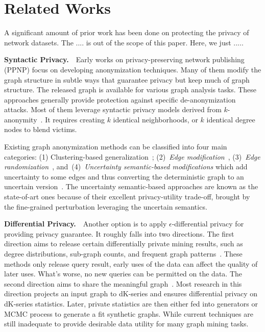\section{Related Works}
A significant amount of prior work has been done on protecting the privacy of network datasets.
The .... is out of the scope of this paper. Here, we just ..... 

\textbf{Syntactic Privacy.}~~Early works on privacy-preserving network publishing (PPNP) focus on developing anonymization techniques. Many of them modify the graph structure in subtle ways that guarantee privacy but keep much of graph structure.  The released graph is available for various graph analysis tasks. These approaches generally provide protection against specific de-anonymization attacks. Most of them leverage syntactic privacy models derived from $k$-anonymity~\cite{Sweeney:2002:KAM:774544.774552}. It requires creating $k$ identical neighborhoods, or $k$ identical degree nodes to blend victims. 

Existing graph anonymization methods can be classified into four main categories: (1) Clustering-based generalization~\cite{Hay_Anonymizing_2007,Bhagat_Class_2009,hay2010resisting}; (2)~{\em Edge modification}~\cite{Liu_Towards_2008, Zhou_Preserving_2008, Wang2011, Wu_k_2010, Skarkala_Privacy_2012}, 
(3)~{\em Edge randomization}~\cite{Liu_Privacy_2009,Ying_Randomizing_2008, Ninggal_Utility_2015},
and~(4)~{\em Uncertainty semantic-based modifications} which add uncertainty to some edges and thus converting the deterministic graph to an uncertain version~\cite{Boldi_Injecting_2012, Nguyen_Anonymizing_2015}. The uncertainty semantic-based approaches are known as the state-of-art ones because of their excellent privacy-utility trade-off, brought by the fine-grained perturbation leveraging the uncertain semantics. 

 
\textbf{Differential Privacy.}~~Another option is to apply $\epsilon$-differential privacy for providing privacy guarantee. It roughly falls into two directions. The first direction aims to release certain differentially private mining results, such as degree distributions, sub-graph counts, and frequent graph patterns~\cite{Xiao_Differentially_2014,Day:2016}. These methods only release query result, early uses of the data can affect the quality of later uses. What's worse, no new queries can be permitted on the data. The second direction aims to share the meaningful graph~\cite{Sala_Sharing_2011}. Most research in this direction projects an input graph to dK-series and ensures differential privacy on dK-series statistics. Later, private statistics are then either fed into generators or MCMC process to generate a fit synthetic graphs. While current techniques are still inadequate to provide desirable data utility for many graph mining tasks. 


